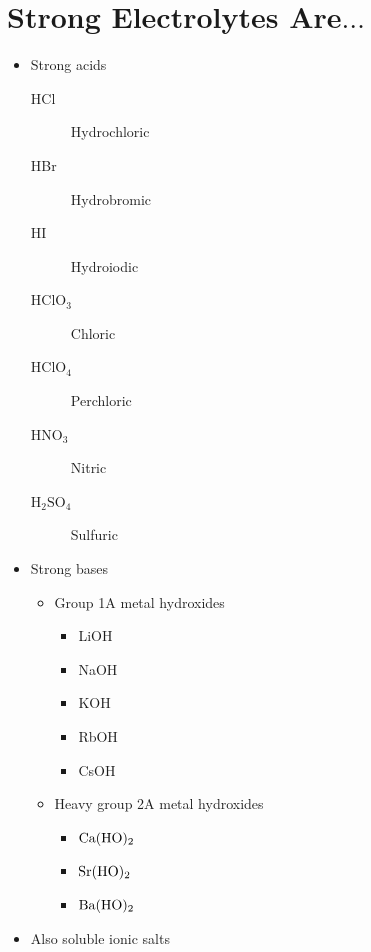 \documentclass[
	chapter=4
]{chem122notes}
\begin{document}
\section{Strong Electrolytes Are$\dots$}\label{sec:strong-electrolytes-are}
\begin{itemize}
	\item Strong acids
	\begin{description}
		\item[HCl] Hydrochloric
		\item[HBr] Hydrobromic
		\item[HI] Hydroiodic
		\item[HCl$\mbox{O}_{3}$] Chloric
		\item[HCl$\mbox{O}_{4}$] Perchloric
		\item[HN$\mbox{O}_{3}$] Nitric
		\item[$\mbox{H}_{2}\mbox{SO}_{4}$] Sulfuric
	\end{description}
	\item Strong bases
	\begin{itemize}
		\item Group 1A metal hydroxides
		\begin{itemize}
			\item LiOH
			\item NaOH
			\item KOH
			\item RbOH
			\item CsOH
		\end{itemize}
		\item Heavy group 2A metal hydroxides
		\begin{itemize}
			\item $\element{Ca}(\element{HO})_{2}$
			\item $\element{Sr}(\element{HO})_{2}$
			\item $\element{Ba}(\element{HO})_{2}$
		\end{itemize}
	\end{itemize}
	\item Also soluble ionic salts
\end{itemize}
\end{document}
